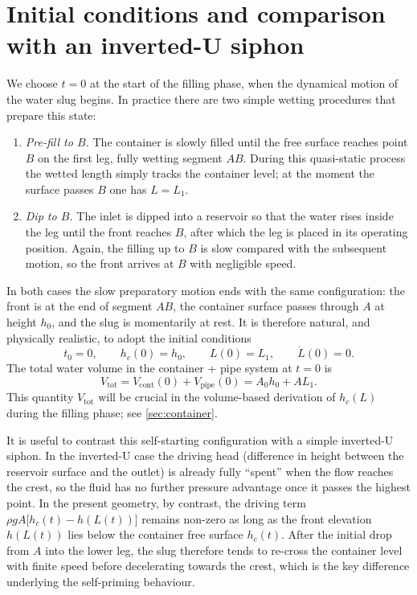 \documentclass[11pt]{article}
\begin{document}
\section{Initial conditions and comparison with an inverted-U siphon}
\label{sec:ICs}

We choose $t = 0$ at the start of the filling phase, when the dynamical motion of the
water slug begins. In practice there are two simple wetting procedures that prepare this
state:
\begin{enumerate}
  \item \emph{Pre-fill to $B$.} The container is slowly filled until the free surface reaches
        point $B$ on the first leg, fully wetting segment $AB$. During this quasi-static
        process the wetted length simply tracks the container level; at the moment the
        surface passes $B$ one has $L=L_1$.
  \item \emph{Dip to $B$.} The inlet is dipped into a reservoir so that the water rises inside
        the leg until the front reaches $B$, after which the leg is placed in its operating
        position. Again, the filling up to $B$ is slow compared with the subsequent motion,
        so the front arrives at $B$ with negligible speed.
\end{enumerate}
In both cases the slow preparatory motion ends with the same configuration: the front is
at the end of segment $AB$, the container surface passes through $A$ at height $h_0$, and
the slug is momentarily at rest. It is therefore natural, and physically realistic, to adopt
the initial conditions
\begin{equation}
  t_0 = 0,\qquad h_c(0)=h_0,\qquad L(0) = L_1,\qquad \dot L(0) = 0.
  \label{eq:IC}
\end{equation}
The total water volume in the container + pipe system at $t = 0$ is
\[
  V_{\text{tot}}
  = V_{\text{cont}}(0) + V_{\text{pipe}}(0)
  = A_0 h_0 + A L_1.
\]
This quantity $V_{\text{tot}}$ will be crucial in the volume-based derivation of $h_c(L)$ during
the filling phase; see \cref{sec:container}.

It is useful to contrast this self-starting configuration with a simple inverted-U siphon.
In the inverted-U case the driving head (difference in height between the reservoir surface
and the outlet) is already fully ``spent'' when the flow reaches the crest, so the fluid has
no further pressure advantage once it passes the highest point. In the present geometry,
by contrast, the driving term $\rho g A\bigl[h_c(t)-h(L(t))\bigr]$ remains non-zero as long
as the front elevation $h(L(t))$ lies below the container free surface $h_c(t)$. After the
initial drop from $A$ into the lower leg, the slug therefore tends to re-cross the container
level with finite speed before decelerating towards the crest, which is the key difference
underlying the self-priming behaviour.
\end{document}
